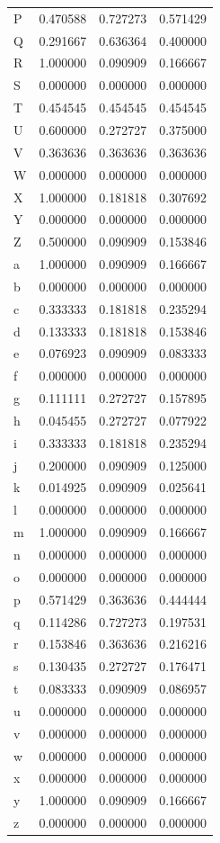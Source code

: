 \documentclass[11pt,a4paper]{article}
\begin{document}
\begin{longtable}{@{}l c c c@{}}
P  & 0.470588 & 0.727273 & 0.571429 \\
Q  & 0.291667 & 0.636364 & 0.400000 \\
R  & 1.000000 & 0.090909 & 0.166667 \\
S  & 0.000000 & 0.000000 & 0.000000 \\
T  & 0.454545 & 0.454545 & 0.454545 \\
U  & 0.600000 & 0.272727 & 0.375000 \\
V  & 0.363636 & 0.363636 & 0.363636 \\
W  & 0.000000 & 0.000000 & 0.000000 \\
X  & 1.000000 & 0.181818 & 0.307692 \\
Y  & 0.000000 & 0.000000 & 0.000000 \\
Z  & 0.500000 & 0.090909 & 0.153846 \\
a  & 1.000000 & 0.090909 & 0.166667 \\
b  & 0.000000 & 0.000000 & 0.000000 \\
c  & 0.333333 & 0.181818 & 0.235294 \\
d  & 0.133333 & 0.181818 & 0.153846 \\
e  & 0.076923 & 0.090909 & 0.083333 \\
f  & 0.000000 & 0.000000 & 0.000000 \\
g  & 0.111111 & 0.272727 & 0.157895 \\
h  & 0.045455 & 0.272727 & 0.077922 \\
i  & 0.333333 & 0.181818 & 0.235294 \\
j  & 0.200000 & 0.090909 & 0.125000 \\
k  & 0.014925 & 0.090909 & 0.025641 \\
l  & 0.000000 & 0.000000 & 0.000000 \\
m  & 1.000000 & 0.090909 & 0.166667 \\
n  & 0.000000 & 0.000000 & 0.000000 \\
o  & 0.000000 & 0.000000 & 0.000000 \\
p  & 0.571429 & 0.363636 & 0.444444 \\
q  & 0.114286 & 0.727273 & 0.197531 \\
r  & 0.153846 & 0.363636 & 0.216216 \\
s  & 0.130435 & 0.272727 & 0.176471 \\
t  & 0.083333 & 0.090909 & 0.086957 \\
u  & 0.000000 & 0.000000 & 0.000000 \\
v  & 0.000000 & 0.000000 & 0.000000 \\
w  & 0.000000 & 0.000000 & 0.000000 \\
x  & 0.000000 & 0.000000 & 0.000000 \\
y  & 1.000000 & 0.090909 & 0.166667 \\
z  & 0.000000 & 0.000000 & 0.000000 \\
\end{longtable}
\normalsize
\end{document}
